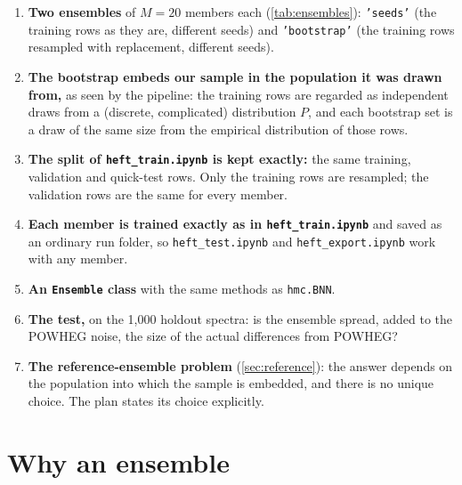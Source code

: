 \documentclass[11pt]{article}
\newcommand{\file}[1]{\nolinkurl{#1}}
\newcommand{\code}[1]{\texttt{#1}}
\begin{document}
\begin{keyidea}
\begin{enumerate}
  \item \textbf{Two ensembles} of $M = 20$ members each (\cref{tab:ensembles}):
    \code{'seeds'} (the training rows as they are, different seeds) and
    \code{'bootstrap'} (the training rows resampled with replacement, different seeds).
  \item \textbf{The bootstrap embeds our sample in the population it was drawn from,}
    as seen by the pipeline: the training rows are regarded as independent draws from a
    (discrete, complicated) distribution $P$, and each bootstrap set is a draw of the
    same size from the empirical distribution of those rows.
  \item \textbf{The split of \file{heft_train.ipynb} is kept exactly:} the same training,
    validation and quick-test rows. Only the training rows are resampled; the
    validation rows are the same for every member.
  \item \textbf{Each member is trained exactly as in \file{heft_train.ipynb}} and saved as an
    ordinary run folder, so \file{heft_test.ipynb} and \file{heft_export.ipynb} work with
    any member.
  \item \textbf{An \code{Ensemble} class} with the same methods as \code{hmc.BNN}.
  \item \textbf{The test,} on the 1,000 holdout spectra: is the ensemble spread, added to
    the POWHEG noise, the size of the actual differences from POWHEG?
  \item \textbf{The reference-ensemble problem} (\cref{sec:reference}): the answer depends
    on the population into which the sample is embedded, and there is no unique choice.
    The plan states its choice explicitly.
\end{enumerate}
\end{keyidea}

\tableofcontents

\section{Why an ensemble}
\label{sec:why}
\end{document}
